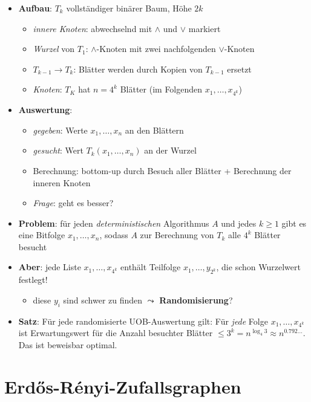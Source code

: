 \begin{itemize}
  \item \textbf{Aufbau}: $ T_k $ vollständiger binärer Baum, Höhe $ 2k $
  \begin{itemize}
    \item \emph{innere Knoten}: abwechselnd mit $ \wedge $ und $ \vee $ markiert
    \item \emph{Wurzel} von $ T_1 $: $ \wedge $-Knoten mit zwei nachfolgenden $ \vee $-Knoten
    \item $ T_{k-1} \to T_k $: Blätter werden durch Kopien von $ T_{k-1} $ ersetzt
    \item \emph{Knoten}: $ T_K $ hat $ n = 4^k $ Blätter (im Folgenden $ x_1, \dots, x_{4^k} $)
  \end{itemize}
  \item \textbf{Auswertung}:
  \begin{itemize}
    \item \emph{gegeben}: Werte $ x_1, \dots, x_n $ an den Blättern
    \item \emph{gesucht}: Wert $ T_k(x_1, \dots, x_n) $ an der Wurzel
    \item Berechnung: bottom-up durch Besuch aller Blätter + Berechnung der inneren Knoten
    \item \emph{Frage}: geht es besser?
  \end{itemize}
  \item \textbf{Problem}: für jeden \emph{deterministischen} Algorithmus $ A $ und jedes $ k \geq 1 $ gibt es eine Bitfolge $ x_1, \dots, x_n $, sodass $ A $ zur Berechnung von $ T_k $ alle $ 4^k $ Blätter besucht
  \item \textbf{Aber}: jede Liste $ x_1, \dots, x_{4^k} $ enthält Teilfolge $ x_1, \dots, y_{2^k} $, die schon Wurzelwert festlegt!
  \begin{itemize}
    \item diese $ y_i $ sind schwer zu finden $ \leadsto $ \textbf{Randomisierung}?
  \end{itemize}
  \item \textbf{Satz}: Für jede randomisierte UOB-Auswertung gilt: Für \emph{jede} Folge $ x_1, \dots, x_{4^k} $ ist Erwartungswert für die Anzahl besuchter Blätter $ \leq 3^k = n^{\log_4 3} \approx n^{0.792\dots} $. Das ist beweisbar optimal.
\end{itemize}

\section{Erd\H{o}s-Rényi-Zufallsgraphen}

